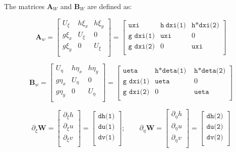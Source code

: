 \documentclass{article}
\newcommand{\code}[1]{\texttt{#1}}
\begin{document}
The matrices $\mathbf{A}_W$ and $\mathbf{B}_W$ are defined as: 

\[ \mathbf{A}_w = 
\begin{bmatrix}
    U_{\xi} & h \xi_x & h \xi_{y} \\
    g \xi_x &    U_{\xi}  & 0    \\
    g \xi_y &   0   & U_{\xi}    \\    
\end{bmatrix} =
\begin{bmatrix}
    \code{uxi }& \code{h} \ \code{dxi(1)} &\code{h*dxi(2)}\\
    \code{g dxi(1)}& \code{uxi} & 0  \\    
    \code{g dxi(2)}&     0       & \code{uxi}  \\          
\end{bmatrix} 
\]

\[ \mathbf{B}_w = 
\begin{bmatrix}
    U_{\eta} & h \eta_x    & h \eta_{y} \\
    g \eta_x &    U_{\eta}  & 0    \\
    g \eta_y &      0       & U_{\eta}    \\    
\end{bmatrix} =
\begin{bmatrix}
    \code{ueta }  & \code{h*deta(1) } & \code{h*deta(2)}\\
    \code{g dxi(1)} & \code{ueta}  & 0  \\    
    \code{g dxi(2)} &     0  	   &  \code{ueta}  \\          
\end{bmatrix} 
\]


\[ \partial_\xi \mathbf{W} = 
\begin{bmatrix}
    \partial_\xi h \\
	\partial_\xi u \\
    \partial_\xi v \\
\end{bmatrix}
 =  {
	 \begin{bmatrix}
	 \code{dh(1)} \\
	 \code{du(1)} \\	 
	 \code{dv(1)} \\	 	 	 
\end{bmatrix} 
}  ;  \quad  \quad
\partial_\eta \mathbf{W} = 
\begin{bmatrix}
    \partial_\eta h \\
	\partial_\eta u \\
    \partial_\eta v \\
\end{bmatrix}
 =  {
	 \begin{bmatrix}
	 \code{dh(2)} \\
	 \code{du(2)} \\	 
	 \code{dv(2)} \\	 	 	 
\end{bmatrix} 
}
 \] 
\end{document}
